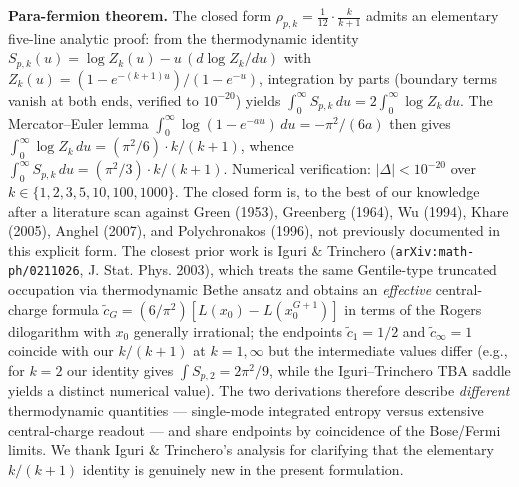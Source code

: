 \documentclass[reprint,amsmath,amssymb,aps,prd,superscriptaddress]{revtex4-2}
\providecommand{\1}{\mathbf{1}}
\begin{document}
\smallskip
\noindent\textbf{Para-fermion theorem.} The closed form $\rho_{p,k} = \tfrac{1}{12}\cdot\tfrac{k}{k+1}$
admits an elementary five-line analytic proof: from the thermodynamic identity
$S_{p,k}(u) = \log Z_k(u) - u\,(d\log Z_k/du)$ with $Z_k(u) = (1-e^{-(k+1)u})/(1-e^{-u})$,
integration by parts (boundary terms vanish at both ends, verified to $10^{-20}$) yields
$\int_0^\infty S_{p,k}\,du = 2\int_0^\infty \log Z_k\,du$. The Mercator--Euler lemma
$\int_0^\infty \log(1-e^{-au})\,du = -\pi^2/(6a)$ then gives
$\int_0^\infty \log Z_k\,du = (\pi^2/6)\cdot k/(k+1)$, whence
$\int_0^\infty S_{p,k}\,du = (\pi^2/3)\cdot k/(k+1)$. Numerical verification: $|\Delta|<10^{-20}$
over $k \in \{1,2,3,5,10,100,1000\}$. The closed form is, to the best of our knowledge after a
literature scan against Green (1953), Greenberg (1964), Wu (1994), Khare (2005), Anghel (2007),
and Polychronakos (1996), not previously documented in this explicit form. The closest prior
work is Iguri \& Trinchero (\texttt{arXiv:math-ph/0211026}, J. Stat. Phys. 2003), which treats
the same Gentile-type truncated occupation via thermodynamic Bethe ansatz and obtains an
\emph{effective} central-charge formula
$\tilde{c}_G = (6/\pi^2)[L(x_0)-L(x_0^{G+1})]$ in terms of the Rogers dilogarithm with $x_0$
generally irrational; the endpoints $\tilde{c}_1 = 1/2$ and $\tilde{c}_\infty = 1$ coincide
with our $k/(k+1)$ at $k=1,\infty$ but the intermediate values differ (e.g., for $k=2$ our
identity gives $\int S_{p,2} = 2\pi^2/9$, while the Iguri--Trinchero TBA saddle yields a
distinct numerical value). The two derivations therefore describe \emph{different} thermodynamic
quantities --- single-mode integrated entropy versus extensive central-charge readout --- and
share endpoints by coincidence of the Bose/Fermi limits. We thank Iguri \& Trinchero's analysis
for clarifying that the elementary $k/(k+1)$ identity is genuinely new in the present formulation.
\end{document}
